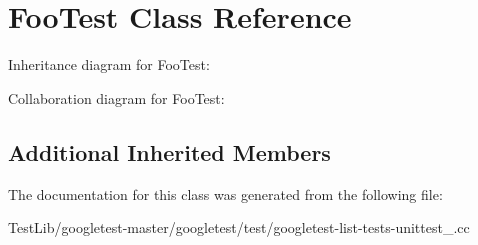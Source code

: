 \hypertarget{classFooTest}{}\section{Foo\+Test Class Reference}
\label{classFooTest}


Inheritance diagram for Foo\+Test\+:


Collaboration diagram for Foo\+Test\+:
\subsection*{Additional Inherited Members}


The documentation for this class was generated from the following file\+:\begin{DoxyCompactItemize}
\item 
Test\+Lib/googletest-\/master/googletest/test/googletest-\/list-\/tests-\/unittest\+\_\+.\+cc\end{DoxyCompactItemize}
